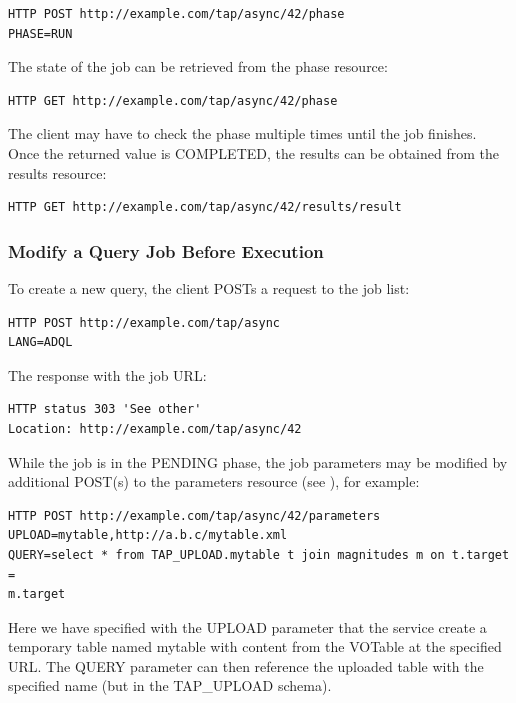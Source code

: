 \documentclass[11pt,letter]{ivoa}
\begin{document}
\begin{verbatim}
HTTP POST http://example.com/tap/async/42/phase
PHASE=RUN
\end{verbatim}

The state of the job can be retrieved from the phase resource:

\begin{verbatim}
HTTP GET http://example.com/tap/async/42/phase
\end{verbatim}

The client may have to check the phase multiple times until the job 
finishes. Once the returned value is COMPLETED, the results can be obtained 
from the results resource:

\begin{verbatim}
HTTP GET http://example.com/tap/async/42/results/result
\end{verbatim}

\subsubsection{Modify a Query Job Before Execution}
To create a new query, the client POSTs a request to the job list:

\begin{verbatim}
HTTP POST http://example.com/tap/async
LANG=ADQL
\end{verbatim}

The response with the job URL:

\begin{verbatim}
HTTP status 303 'See other'
Location: http://example.com/tap/async/42
\end{verbatim}

While the job is in the PENDING phase, the job parameters may be modified 
by additional POST(s) to the parameters resource (see 
\citep{std:DALI}), for example:

\begin{verbatim}
HTTP POST http://example.com/tap/async/42/parameters
UPLOAD=mytable,http://a.b.c/mytable.xml
QUERY=select * from TAP_UPLOAD.mytable t join magnitudes m on t.target = 
m.target
\end{verbatim}

Here we have specified with the UPLOAD parameter that the service create a 
temporary table named mytable with content from the VOTable at the specified 
URL. The QUERY parameter can then reference the uploaded table with the 
specified name (but in the TAP\_UPLOAD schema).
\end{document}
